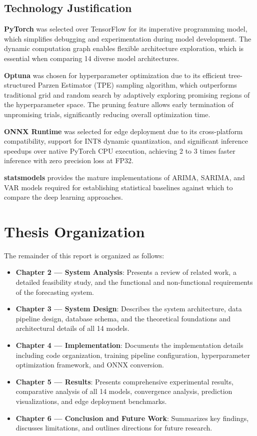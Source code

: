 \subsection{Technology Justification}

\textbf{PyTorch} was selected over TensorFlow for its imperative programming model, which simplifies debugging and experimentation during model development. The dynamic computation graph enables flexible architecture exploration, which is essential when comparing 14 diverse model architectures.

\textbf{Optuna} was chosen for hyperparameter optimization due to its efficient tree-structured Parzen Estimator (TPE) sampling algorithm, which outperforms traditional grid and random search by adaptively exploring promising regions of the hyperparameter space. The pruning feature allows early termination of unpromising trials, significantly reducing overall optimization time.

\textbf{ONNX Runtime} was selected for edge deployment due to its cross-platform compatibility, support for INT8 dynamic quantization, and significant inference speedups over native PyTorch CPU execution, achieving 2 to 3 times faster inference with zero precision loss at FP32.

\textbf{statsmodels} provides the mature implementations of ARIMA, SARIMA, and VAR models required for establishing statistical baselines against which to compare the deep learning approaches.

\section{Thesis Organization}

The remainder of this report is organized as follows:

\begin{itemize}
    \item \textbf{Chapter 2 --- System Analysis}: Presents a review of related work, a detailed feasibility study, and the functional and non-functional requirements of the forecasting system.
    \item \textbf{Chapter 3 --- System Design}: Describes the system architecture, data pipeline design, database schema, and the theoretical foundations and architectural details of all 14 models.
    \item \textbf{Chapter 4 --- Implementation}: Documents the implementation details including code organization, training pipeline configuration, hyperparameter optimization framework, and ONNX conversion.
    \item \textbf{Chapter 5 --- Results}: Presents comprehensive experimental results, comparative analysis of all 14 models, convergence analysis, prediction visualizations, and edge deployment benchmarks.
    \item \textbf{Chapter 6 --- Conclusion and Future Work}: Summarizes key findings, discusses limitations, and outlines directions for future research.
\end{itemize}
